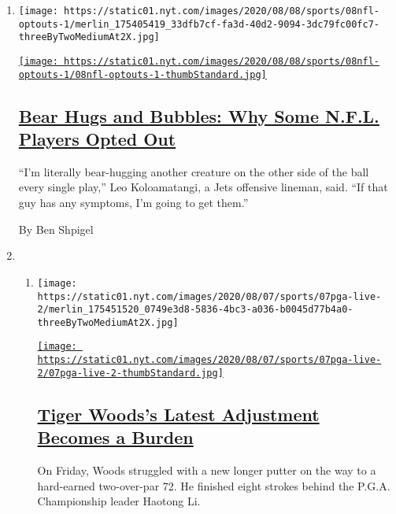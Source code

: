 \begin{enumerate}
\def\labelenumi{\arabic{enumi}.}
\item
  \texttt{[image: https://static01.nyt.com/images/2020/08/08/sports/08nfl-optouts-1/merlin\_175405419\_33dfb7cf-fa3d-40d2-9094-3dc79fc00fc7-threeByTwoMediumAt2X.jpg]}

  \href{/2020/08/08/sports/football/nfl-players-opt-out.html}{\texttt{[image: https://static01.nyt.com/images/2020/08/08/sports/08nfl-optouts-1/08nfl-optouts-1-thumbStandard.jpg]}}

  \hypertarget{bear-hugs-and-bubbles-why-some-nfl-players-opted-out}{%
  \subsection{\texorpdfstring{\href{/2020/08/08/sports/football/nfl-players-opt-out.html}{Bear
  Hugs and Bubbles: Why Some N.F.L. Players Opted
  Out}}{Bear Hugs and Bubbles: Why Some N.F.L. Players Opted Out}}\label{bear-hugs-and-bubbles-why-some-nfl-players-opted-out}}

  ``I'm literally bear-hugging another creature on the other side of the
  ball every single play,'' Leo Koloamatangi, a Jets offensive lineman,
  said. ``If that guy has any symptoms, I'm going to get them.''

  By Ben Shpigel
\item
  \begin{enumerate}
  \def\labelenumii{\arabic{enumii}.}
  \item
    \texttt{[image: https://static01.nyt.com/images/2020/08/07/sports/07pga-live-2/merlin\_175451520\_0749e3d8-5836-4bc3-a036-b0045d77b4a0-threeByTwoMediumAt2X.jpg]}

    \href{/2020/08/08/sports/golf/tiger-woods-pga-championship-friday.html}{\texttt{[image: https://static01.nyt.com/images/2020/08/07/sports/07pga-live-2/07pga-live-2-thumbStandard.jpg]}}

    \hypertarget{tiger-woodss-latest-adjustment-becomes-a-burden}{%
    \subsection{\texorpdfstring{\href{/2020/08/08/sports/golf/tiger-woods-pga-championship-friday.html}{Tiger
    Woods's Latest Adjustment Becomes a
    Burden}}{Tiger Woods's Latest Adjustment Becomes a Burden}}\label{tiger-woodss-latest-adjustment-becomes-a-burden}}

    On Friday, Woods struggled with a new longer putter on the way to a
    hard-earned two-over-par 72. He finished eight strokes behind the
    P.G.A. Championship leader Haotong Li.


\end{enumerate}
\end{enumerate}
